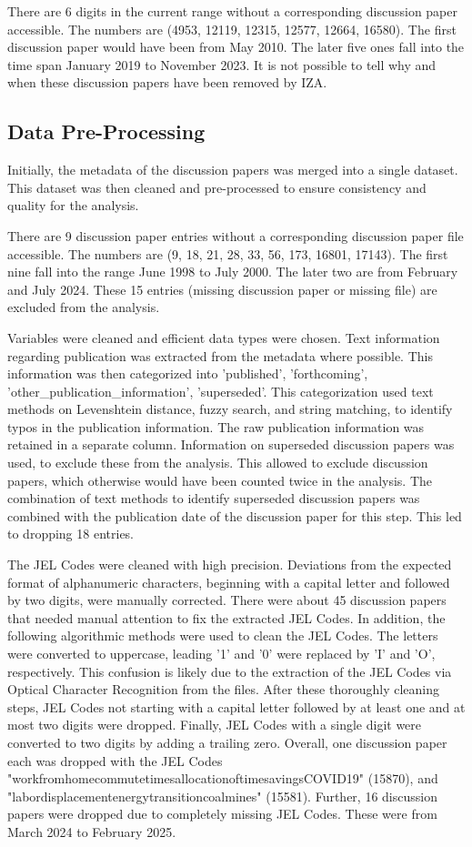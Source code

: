 \documentclass[11pt, a4paper, leqno]{article}
\begin{document}
There are 6 digits in the current range without a corresponding discussion paper accessible.
The numbers are (4953, 12119, 12315, 12577, 12664, 16580).
The first discussion paper would have been from May 2010.
The later five ones fall into the time span January 2019 to November 2023.
It is not possible to tell why and when these discussion papers have been removed by IZA.

\subsection{Data Pre-Processing}
Initially, the metadata of the discussion papers was merged into a single dataset.
This dataset was then cleaned and pre-processed to ensure consistency and quality for the analysis.

There are 9 discussion paper entries without a corresponding discussion paper file accessible.
The numbers are (9, 18, 21, 28, 33, 56, 173, 16801, 17143).
The first nine fall into the range June 1998 to July 2000.
The later two are from February and July 2024.
These 15 entries (missing discussion paper or missing file) are excluded from the analysis.

Variables were cleaned and efficient data types were chosen.
Text information regarding publication was extracted from the metadata where possible.
This information was then categorized into 'published', 'forthcoming', 'other\_publication\_information', 'superseded'.
This categorization used text methods on Levenshtein distance, fuzzy search, and string matching, to identify typos in the publication information.
The raw publication information was retained in a separate column.
Information on superseded discussion papers was used, to exclude these from the analysis.
This allowed to exclude discussion papers, which otherwise would have been counted twice in the analysis.
The combination of text methods to identify superseded discussion papers was combined with the publication date of the discussion paper for this step.
This led to dropping 18 entries.

The JEL Codes were cleaned with high precision.
Deviations from the expected format of alphanumeric characters, beginning with a capital letter and followed by two digits, were manually corrected.
There were about 45 discussion papers that needed manual attention to fix the extracted JEL Codes.
In addition, the following algorithmic methods were used to clean the JEL Codes.
The letters were converted to uppercase, leading '1' and '0' were replaced by 'I' and 'O', respectively.
This confusion is likely due to the extraction of the JEL Codes via Optical Character Recognition from the files.
After these thoroughly cleaning steps, JEL Codes not starting with a capital letter followed by at least one and at most two digits were dropped.
Finally, JEL Codes with a single digit were converted to two digits by adding a trailing zero.
Overall, one discussion paper each was dropped with the JEL Codes "workfromhomecommutetimesallocationoftimesavingsCOVID19" (15870), and
"labordisplacementenergytransitioncoalmines" (15581).
Further, 16 discussion papers were dropped due to completely missing JEL Codes. These were from March 2024 to February 2025.
\end{document}
